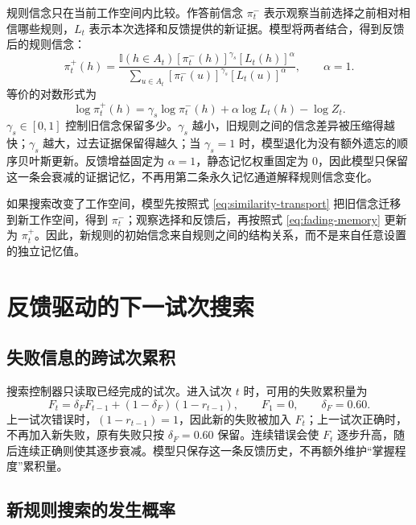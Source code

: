 \documentclass[12pt]{article}
\newcommand{\ind}{\mathbb I}
\begin{document}
规则信念只在当前工作空间内比较。作答前信念 $\pi_t^{-}$ 表示观察当前选择之前相对相信哪些规则，$L_t$ 表示本次选择和反馈提供的新证据。模型将两者结合，得到反馈后的规则信念：
\begin{equation}
\pi_t^{+}(h)
=
\frac{
\ind(h\in A_t)
[\pi_t^{-}(h)]^{\gamma_s}
[L_t(h)]^{\alpha}
}{
\sum_{u\in A_t}
[\pi_t^{-}(u)]^{\gamma_s}
[L_t(u)]^{\alpha}
},
\qquad
\alpha=1.
\label{eq:fading-memory}
\end{equation}
等价的对数形式为
\begin{equation}
\log\pi_t^{+}(h)
=\gamma_s\log\pi_t^{-}(h)+\alpha\log L_t(h)-\log Z_t.
\label{eq:fading-memory-log}
\end{equation}
$\gamma_s\in[0,1]$ 控制旧信念保留多少。$\gamma_s$ 越小，旧规则之间的信念差异被压缩得越快；$\gamma_s$ 越大，过去证据保留得越久；当 $\gamma_s=1$ 时，模型退化为没有额外遗忘的顺序贝叶斯更新。反馈增益固定为 $\alpha=1$，静态记忆权重固定为 0，因此模型只保留这一条会衰减的证据记忆，不再用第二条永久记忆通道解释规则信念变化。

如果搜索改变了工作空间，模型先按照式 \eqref{eq:similarity-transport} 把旧信念迁移到新工作空间，得到 $\pi_t^{-}$；观察选择和反馈后，再按照式 \eqref{eq:fading-memory} 更新为 $\pi_t^{+}$。因此，新规则的初始信念来自规则之间的结构关系，而不是来自任意设置的独立记忆值。


\section{反馈驱动的下一试次搜索}

\subsection{失败信息的跨试次累积}

搜索控制器只读取已经完成的试次。进入试次 $t$ 时，可用的失败累积量为
\begin{equation}
F_t
=\delta_F F_{t-1}+(1-\delta_F)(1-r_{t-1}),
\qquad
F_1=0,
\qquad
\delta_F=0.60.
\label{eq:failure-accumulator}
\end{equation}
上一试次错误时，$(1-r_{t-1})=1$，因此新的失败被加入 $F_t$；上一试次正确时，不再加入新失败，原有失败只按 $\delta_F=0.60$ 保留。连续错误会使 $F_t$ 逐步升高，随后连续正确则使其逐步衰减。模型只保存这一条反馈历史，不再额外维护“掌握程度”累积量。

\subsection{新规则搜索的发生概率}
\end{document}
